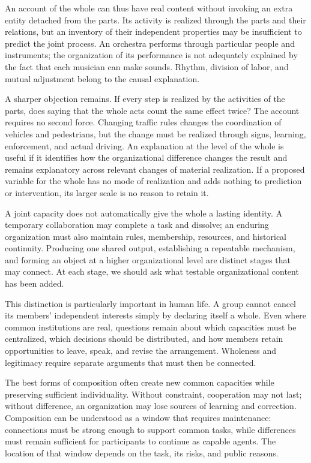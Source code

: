 \documentclass[
  english,
  11pt,
  oneside]{book}
\begin{document}
An account of the whole can thus have real content without invoking an extra entity detached from the parts. Its activity is realized through the parts and their relations, but an inventory of their independent properties may be insufficient to predict the joint process. An orchestra performs through particular people and instruments; the organization of its performance is not adequately explained by the fact that each musician can make sounds. Rhythm, division of labor, and mutual adjustment belong to the causal explanation.

A sharper objection remains. If every step is realized by the activities of the parts, does saying that the whole acts count the same effect twice? The account requires no second force. Changing traffic rules changes the coordination of vehicles and pedestrians, but the change must be realized through signs, learning, enforcement, and actual driving. An explanation at the level of the whole is useful if it identifies how the organizational difference changes the result and remains explanatory across relevant changes of material realization. If a proposed variable for the whole has no mode of realization and adds nothing to prediction or intervention, its larger scale is no reason to retain it.

A joint capacity does not automatically give the whole a lasting identity. A temporary collaboration may complete a task and dissolve; an enduring organization must also maintain rules, membership, resources, and historical continuity. Producing one shared output, establishing a repeatable mechanism, and forming an object at a higher organizational level are distinct stages that may connect. At each stage, we should ask what testable organizational content has been added.

This distinction is particularly important in human life. A group cannot cancel its members' independent interests simply by declaring itself a whole. Even where common institutions are real, questions remain about which capacities must be centralized, which decisions should be distributed, and how members retain opportunities to leave, speak, and revise the arrangement. Wholeness and legitimacy require separate arguments that must then be connected.

The best forms of composition often create new common capacities while preserving sufficient individuality. Without constraint, cooperation may not last; without difference, an organization may lose sources of learning and correction. Composition can be understood as a window that requires maintenance: connections must be strong enough to support common tasks, while differences must remain sufficient for participants to continue as capable agents. The location of that window depends on the task, its risks, and public reasons.
\end{document}
